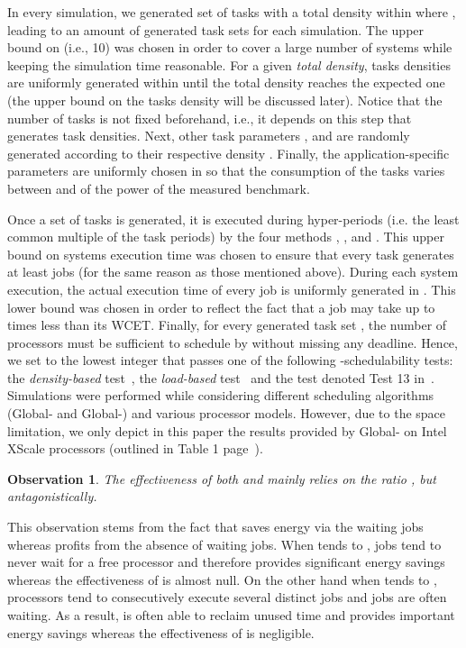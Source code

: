 \documentclass[times, 10pt,twocolumn]{article}
\newtheorem{Observation}{Observation}
\begin{document}
In every simulation, we generated  set of tasks with a total density  within  where , leading to an amount of  generated task sets for each simulation. The upper bound on  (i.e., 10) was chosen in order to cover a large number of systems while keeping the simulation time reasonable. For a given \emph{total density}, tasks densities  are uniformly generated within  until the total density  reaches the expected one (the upper bound  on the tasks density will be discussed later). Notice that the number  of tasks is not fixed beforehand, i.e., it depends on this step that generates task densities. Next, other task parameters ,  and  are randomly generated according to their respective density . Finally, the application-specific parameters  are uniformly chosen in  so that the consumption of the tasks varies between  and  of the power of the measured benchmark. 

Once a set of tasks is generated, it is executed during  hyper-periods (i.e. the least common multiple of the task periods) by the four methods , ,  and . This upper bound on systems execution time was chosen to ensure that every task generates at least  jobs (for the same reason as those mentioned above). During each system execution, the actual execution time of every job  is uniformly generated in . This lower bound  was chosen in order to reflect the fact that a job may take up to  times less than its WCET. Finally, for every generated task set , the number  of processors must be sufficient to schedule  by  without missing any deadline. Hence, we set  to the lowest integer that passes one of the following -schedulability tests: the \emph{density-based} test~\cite{Goossens2003Priority-driven}, the \emph{load-based} test~\cite{BaruahBaker:08} and the test denoted Test 13 in~\cite{LivreBaruah}. Simulations were performed while considering different scheduling algorithms (Global- and Global-) and various processor models. However, due to the space limitation, we only depict in this paper the results provided by Global- on Intel XScale processors (outlined in Table 1 page~\pageref{tab:processor_characterisitc}). 

\begin{Observation}
\label{obs:2}
The effectiveness of both  and  mainly relies on the ratio , but antagonistically. 
\end{Observation}

This observation stems from the fact that  saves energy via the waiting jobs whereas  profits from the absence of waiting jobs. When  tends to , jobs tend to never wait for a free processor and  therefore provides significant energy savings whereas the effectiveness of  is almost null. On the other hand when  tends to , processors tend to consecutively execute several distinct jobs and jobs are often waiting. As a result,  is often able to reclaim unused time and provides important energy savings whereas the effectiveness of  is negligible.
\end{document}
